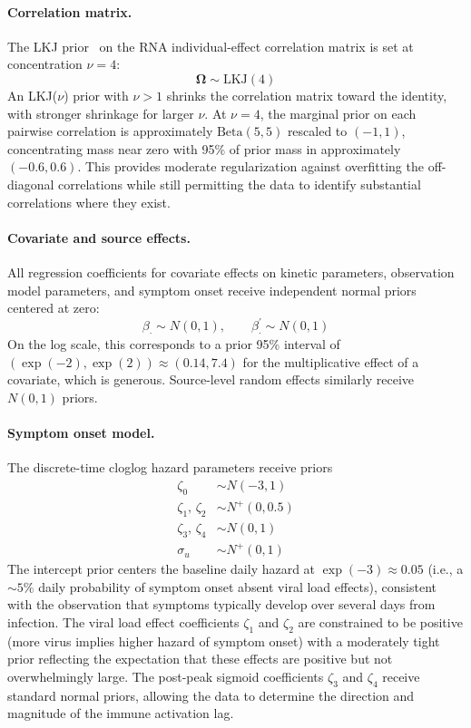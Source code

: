 \documentclass[12pt]{article}
\begin{document}
\paragraph{Correlation matrix.} The LKJ prior~\cite{lewandowski2009generating} on the RNA individual-effect correlation matrix is set at concentration $\nu = 4$:
\begin{equation*}
    \boldsymbol{\Omega} \sim \text{LKJ}(4)
\end{equation*}
An LKJ($\nu$) prior with $\nu > 1$ shrinks the correlation matrix toward the identity, with stronger shrinkage for larger $\nu$. At $\nu = 4$, the marginal prior on each pairwise correlation is approximately $\text{Beta}(5, 5)$ rescaled to $(-1, 1)$, concentrating mass near zero with 95\% of prior mass in approximately $(-0.6, 0.6)$. This provides moderate regularization against overfitting the off-diagonal correlations while still permitting the data to identify substantial correlations where they exist.

\paragraph{Covariate and source effects.} All regression coefficients for covariate effects on kinetic parameters, observation model parameters, and symptom onset receive independent normal priors centered at zero:
\begin{equation*}
    \beta_{\cdot} \sim N(0, 1), \qquad \beta^\prime_{\cdot} \sim N(0, 1)
\end{equation*}
On the log scale, this corresponds to a prior 95\% interval of $(\exp(-2), \exp(2)) \approx (0.14, 7.4)$ for the multiplicative effect of a covariate, which is generous. Source-level random effects similarly receive $N(0, 1)$ priors.

\paragraph{Symptom onset model.} The discrete-time cloglog hazard parameters receive priors
\begin{align*}
    \zeta_0 &\sim N(-3, 1) \\
    \zeta_1,\, \zeta_2 &\sim N^+(0, 0.5) \\
    \zeta_3,\, \zeta_4 &\sim N(0, 1) \\
    \sigma_u &\sim N^+(0, 1)
\end{align*}
The intercept prior centers the baseline daily hazard at $\exp(-3) \approx 0.05$ (i.e., a ${\sim}5\%$ daily probability of symptom onset absent viral load effects), consistent with the observation that symptoms typically develop over several days from infection. The viral load effect coefficients $\zeta_1$ and $\zeta_2$ are constrained to be positive (more virus implies higher hazard of symptom onset) with a moderately tight prior reflecting the expectation that these effects are positive but not overwhelmingly large. The post-peak sigmoid coefficients $\zeta_3$ and $\zeta_4$ receive standard normal priors, allowing the data to determine the direction and magnitude of the immune activation lag.
\end{document}
